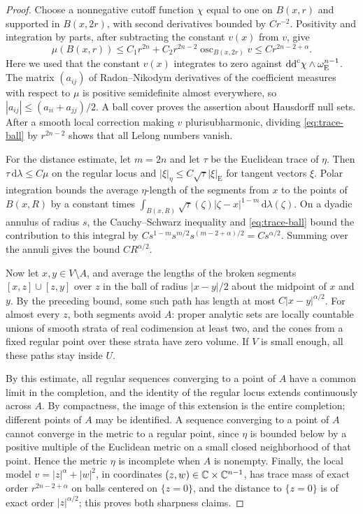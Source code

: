 \begin{proof}
Choose a nonnegative cutoff function $\chi$ equal to one on $B(x,r)$ and supported in $B(x,2r)$, with second derivatives bounded by $Cr^{-2}$. Positivity and integration by parts, after subtracting the constant $v(x)$ from $v$, give
\[
 \mu(B(x,r))\leq C_1r^{2n}+C_2r^{2n-2}
  \operatorname{osc}_{B(x,2r)}v
 \leq Cr^{2n-2+\alpha}.
\]
Here we used that the constant $v(x)$ integrates to zero against $\mathrm{dd}^{\mathrm{c}}\chi\wedge\omega_{\mathrm E}^{n-1}$. The matrix $(a_{ij})$ of Radon--Nikodym derivatives of the coefficient measures with respect to $\mu$ is positive semidefinite almost everywhere, so $|a_{ij}|\leq(a_{ii}+a_{jj})/2$. A ball cover proves the assertion about Hausdorff null sets. After a smooth local correction making $v$ plurisubharmonic, dividing \eqref{eq:trace-ball} by $r^{2n-2}$ shows that all Lelong numbers vanish.

For the distance estimate, let $m=2n$ and let $\tau$ be the Euclidean trace of $\eta$. Then $\tau\,\mathrm{d}\lambda\leq C\mu$ on the regular locus and $|\xi|_\eta\leq C\sqrt\tau|\xi|_{\mathrm E}$ for tangent vectors $\xi$. Polar integration bounds the average $\eta$-length of the segments from $x$ to the points of $B(x,R)$ by a constant times $\int_{B(x,R)}\sqrt\tau(\zeta)|\zeta-x|^{1-m}\,\mathrm{d}\lambda(\zeta)$. On a dyadic annulus of radius $s$, the Cauchy--Schwarz inequality and \eqref{eq:trace-ball} bound the contribution to this integral by $Cs^{1-m}s^{m/2}s^{(m-2+\alpha)/2}=Cs^{\alpha/2}$. Summing over the annuli gives the bound $CR^{\alpha/2}$.

Now let $x,y\in V\setminus A$, and average the lengths of the broken segments $[x,z]\cup[z,y]$ over $z$ in the ball of radius $|x-y|/2$ about the midpoint of $x$ and $y$. By the preceding bound, some such path has length at most $C|x-y|^{\alpha/2}$. For almost every $z$, both segments avoid $A$: proper analytic sets are locally countable unions of smooth strata of real codimension at least two, and the cones from a fixed regular point over these strata have zero volume. If $V$ is small enough, all these paths stay inside $U$.

By this estimate, all regular sequences converging to a point of $A$ have a common limit in the completion, and the identity of the regular locus extends continuously across $A$. By compactness, the image of this extension is the entire completion; different points of $A$ may be identified. A sequence converging to a point of $A$ cannot converge in the metric to a regular point, since $\eta$ is bounded below by a positive multiple of the Euclidean metric on a small closed neighborhood of that point. Hence the metric $\eta$ is incomplete when $A$ is nonempty. Finally, the local model $v=|z|^\alpha+|w|^2$, in coordinates $(z,w)\in\mathbb C\times\mathbb C^{n-1}$, has trace mass of exact order $r^{2n-2+\alpha}$ on balls centered on $\{z=0\}$, and the distance to $\{z=0\}$ is of exact order $|z|^{\alpha/2}$; this proves both sharpness claims.
\end{proof}
